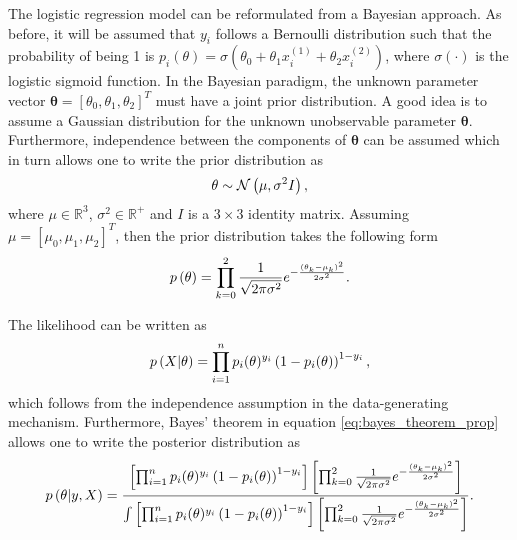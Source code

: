 The logistic regression model can be reformulated from a Bayesian approach. As before, it will be assumed that $y_i$ follows a Bernoulli distribution such that the probability of being 1 is $p_i(\theta) = \sigma(\theta_0 + \theta_1 x_i^{(1)} + \theta_2 x_i^{(2)})$, where $\sigma \left( \cdot \right)$ is the logistic sigmoid function. In the Bayesian paradigm, the unknown parameter vector $\boldsymbol{\theta} = \left[ \theta_0, \theta_1, \theta_2 \right]^T$ must have a joint prior distribution. A good idea is to assume a Gaussian distribution for the unknown unobservable parameter $\boldsymbol{\theta}$. Furthermore, independence between the components of $\boldsymbol{\theta}$ can be assumed which in turn allows one to write the prior distribution as
\begin{equation}
  \theta \sim \mathcal{N}\left( \mu, \sigma^2 I \right),
\end{equation}
where $\mu \in \mathbb{R}^3$, $\sigma^2 \in \mathbb{R}^+$ and $I$ is a $3 \times 3$ identity matrix.
Assuming $\mu = \left[ \mu_0, \mu_1, \mu_2 \right]^T$, then the prior distribution takes the following form
\begin{equation}
  p\left( \theta \right) = \prod_{k = 0}^2 \frac{1}{\sqrt{2 \pi \sigma^2}} e^{- \frac{(\theta_k - \mu_k)^2}{2\sigma^2}}.
\end{equation}

The likelihood can be written as
\begin{equation}
  p\left( X | \theta \right) = \prod_{i = 1}^n  p_i(\theta)^{y_i}\left(1 - p_i(\theta) \right)^{1 - y_i},
\end{equation}
which follows from the independence assumption in the data-generating mechanism. Furthermore, Bayes' theorem in equation \eqref{eq:bayes_theorem_prop} allows one to write the posterior distribution as
\begin{equation}
  p\left( \theta | y, X \right) =
    \frac
    {
      \left[ \prod_{i = 1}^n  p_i(\theta)^{y_i}\left(1 - p_i(\theta) \right)^{1 - y_i} \right]
      \left[ \prod_{k = 0}^2 \frac{1}{\sqrt{2 \pi \sigma^2}} e^{- \frac{(\theta_k - \mu_k)^2}{2\sigma^2}} \right]
    }{
      \int \left[ \prod_{i = 1}^n  p_i(\theta)^{y_i}\left(1 - p_i(\theta) \right)^{1 - y_i} \right]
      \left[ \prod_{k = 0}^2 \frac{1}{\sqrt{2 \pi \sigma^2}} e^{- \frac{(\theta_k - \mu_k)^2}{2\sigma^2}} \right]
    }.
\end{equation}

